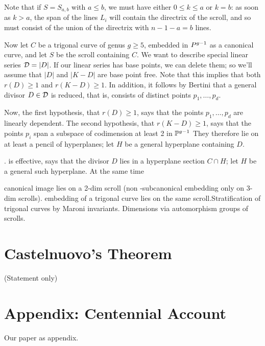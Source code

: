 Note that if $S = S_{a,b}$ with $a \leq b$, we must have either $0 \leq k \leq a$ or $k = b$: as soon as $k > a$, the span of the lines $L_i$ will contain the directrix of the scroll, and so must consist of the union of the directrix with $n-1-a = b$ lines.

Now let $C$ be a trigonal curve of genus $g \geq 5$, embedded in $\\P^{g-1}$ as a canonical curve, and let $S$ be the scroll containing $C$. We want to describe special linear series ${\cal D} = |D|$. If our linear series has base points, we can delete them; so we'll assume that $|D|$ and $|K-D|$ are base point free. Note that this implies that   both  $r(D) \geq 1$ and $r(K-D) \geq 1$. In addition, it follows by Bertini that a general divisor $D \in {\cal D}$ is reduced, that is, consists of distinct points $p_1,\dots,p_d$.

Now, the first hypothesis, that $r(D) \geq 1$, says that the points $p_1,\dots,p_d$ are linearly dependent. The second hypothesis, that $r(K-D) \geq 1$, says that the points $p_i$ span a subspace of codimension at least 2 in ${\mathbb P}^{g-1}$ They therefore lie on at least a pencil of hyperplanes; let $H$ be a general hyperplane containing $D$.




. is effective, says that the divisor $D$ lies in a hyperplane section $C \cap H$; let $H$ be a general such hyperplane. At the same time 

canonical image lies on a 2-dim scroll (non -subcanonical embedding only on 3-dim scrolls).  embedding of a trigonal curve lies on the same scroll.Stratification of trigonal curves by Maroni invariants. Dimensions via automorphism groups of scrolls.

\section{Castelnuovo's Theorem}
(Statement only) 

\section{Appendix: Centennial Account}
Our paper as appendix.
